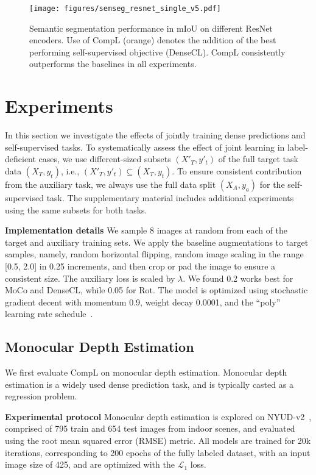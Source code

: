 \documentclass[10pt,twocolumn,letterpaper]{article}
\newcommand{\parsection}[1]{\vspace{1mm}\noindent\textbf{#1 }}
\begin{document}
\begin{figure*}[ht]
\small
 \centering
    \texttt{[image: figures/semseg\_resnet\_single\_v5.pdf]}
\caption{Semantic segmentation performance in mIoU on different ResNet encoders. Use of CompL (orange) denotes the addition of the best performing self-supervised objective (DenseCL). CompL consistently outperforms the baselines in all experiments.}
\label{fig:semseg_encoders}
\vspace{-0.2in}
\end{figure*}


\section{Experiments}
\label{sec:exp}

In this section we investigate the effects of jointly training dense predictions and self-supervised tasks. 
To systematically assess the effect of joint learning in label-deficient cases, we use different-sized subsets $(X'_T, y'_t)$ of the full target task data $(X_T, y_t)$, i.e., $(X'_T, y'_t) \subseteq (X_T, y_t)$. 
To ensure consistent contribution from the auxiliary task, we always use the full data split $(X_A, y_a)$ for the self-supervised task. 
The supplementary material includes additional experiments using the same subsets for both tasks.

\parsection{Implementation details}
We sample 8 images at random from each of the target and auxiliary training sets. 
We apply the baseline augmentations to target samples, namely, random horizontal flipping, random image scaling in the range [0.5, 2.0] in 0.25 increments, and then crop or pad the image to ensure a consistent size. 
The auxiliary loss is scaled by $\lambda$.
We found 0.2 works best for MoCo and DenseCL, while 0.05 for Rot.
The model is optimized using stochastic gradient decent with momentum 0.9, weight decay 0.0001, and the ``poly'' learning rate schedule~\cite{chen2017deeplab}. 




\subsection{Monocular Depth Estimation}
\label{sec:mde}
We first evaluate CompL on monocular depth estimation. 
Monocular depth estimation is a widely used dense prediction task, and is typically casted as a regression problem.

\parsection{Experimental protocol}
Monocular depth estimation is explored on NYUD-v2~\cite{silberman2012indoor}, comprised of 795 train and 654 test images from indoor scenes, and evaluated using the root mean squared error (RMSE) metric. 
All models are trained for 20k iterations, corresponding to 200 epochs of the fully labeled dataset, with an input image size of 425, and are optimized with the $\mathcal{L}_1$ loss. 
\end{document}
